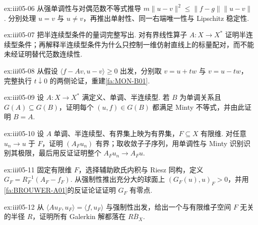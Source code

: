 \begin{FAExercise}[强单调算子的稳定性]{ex:iii05-06}
从强单调性与对偶范数不等式推导 \(\displaystyle m\|u-v\|^2\leqslant\|f-g\|\|u-v\|\). 分别处理 \(\displaystyle u=v\) 与 \(\displaystyle u\neq v\)，再推出单射性、同一右端唯一性与 Lipschitz 稳定性.
\end{FAExercise}

\begin{FAExercise}[半连续型条件]{ex:iii05-07}
把半连续型条件的量词完整写出. 对有界线性算子 \(\displaystyle A:X\to X^*\) 证明半连续型条件；再解释半连续型条件为什么只控制一维仿射直线上的标量配对，而不能未经证明替代范数连续性.
\end{FAExercise}

\begin{FAExercise}[Minty 引理]{ex:iii05-08}
从假设 \(\displaystyle\langle f-Av,u-v\rangle\geqslant0\) 出发，分别取 \(\displaystyle v=u+tw\) 与 \(\displaystyle v=u-tw\)，完整执行 \(\displaystyle t\downarrow0\) 的两侧论证，重建\autoref{fa:MON-B01}.
\end{FAExercise}

\begin{FAExercise}[满定义极大性]{ex:iii05-09}
设 \(\displaystyle A:X\to X^*\) 满定义、单调、半连续型. 若 \(\displaystyle B\) 为单调关系且 \(\displaystyle G(A)\subseteq G(B)\)，证明每个 \(\displaystyle(u,f)\in G(B)\) 都满足 Minty 不等式，并由此证明 \(\displaystyle B=A\).
\end{FAExercise}

\begin{FAExercise}[有限维限制连续性]{ex:iii05-10}
设 \(\displaystyle A\) 单调、半连续型、有界集上映为有界集，\(\displaystyle F\subseteq X\) 有限维. 对任意 \(\displaystyle u_n\to u\) 于 \(\displaystyle F\)，证明 \(\displaystyle(A_Fu_n)\) 有界；取收敛子子序列，用单调性与 Minty 识别识别其极限，最后用反证证明整个 \(\displaystyle A_Fu_n\to A_Fu\).
\end{FAExercise}

\begin{FAExercise}{ex:iii05-11}
固定有限维 \(\displaystyle F\)，选择辅助欧氏内积与 Riesz 同构，定义 \(\displaystyle G_F=R_F^{-1}(A_F-f_F)\). 从强制性推出充分大的球面上 \(\displaystyle(G_F(u),u)_F>0\)，并用\autoref{fa:BROUWER-A01}的反证论证证明 \(\displaystyle G_F\) 有零点.
\end{FAExercise}

\begin{FAExercise}{ex:iii05-12}
从 \(\displaystyle\langle Au_F,u_F\rangle=\langle f,u_F\rangle\) 与强制性出发，给出一个与有限维子空间 \(\displaystyle F\) 无关的半径 \(\displaystyle R\)，证明所有 Galerkin 解都落在 \(\displaystyle R\overline B_X\).
\end{FAExercise}

